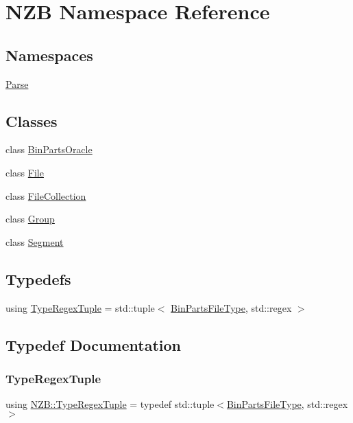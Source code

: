 \hypertarget{namespace_n_z_b}{}\section{N\+ZB Namespace Reference}
\label{namespace_n_z_b}
\subsection*{Namespaces}
\begin{DoxyCompactItemize}
\item 
 \hyperlink{namespace_n_z_b_1_1_parse}{Parse}
\end{DoxyCompactItemize}
\subsection*{Classes}
\begin{DoxyCompactItemize}
\item 
class \hyperlink{class_n_z_b_1_1_bin_parts_oracle}{Bin\+Parts\+Oracle}
\item 
class \hyperlink{class_n_z_b_1_1_file}{File}
\item 
class \hyperlink{class_n_z_b_1_1_file_collection}{File\+Collection}
\item 
class \hyperlink{class_n_z_b_1_1_group}{Group}
\item 
class \hyperlink{class_n_z_b_1_1_segment}{Segment}
\end{DoxyCompactItemize}
\subsection*{Typedefs}
\begin{DoxyCompactItemize}
\item 
using \hyperlink{namespace_n_z_b_a4269a0ca0fc28aeec7108729ce5f4f2d}{Type\+Regex\+Tuple} = std\+::tuple$<$ \hyperlink{bin_parts_8h_aa1299690332d809ca3f8cb77e7019e41}{Bin\+Parts\+File\+Type}, std\+::regex $>$
\end{DoxyCompactItemize}


\subsection{Typedef Documentation}
\hypertarget{namespace_n_z_b_a4269a0ca0fc28aeec7108729ce5f4f2d}{}\label{namespace_n_z_b_a4269a0ca0fc28aeec7108729ce5f4f2d} 
\subsubsection{\texorpdfstring{Type\+Regex\+Tuple}{TypeRegexTuple}}
{\footnotesize\ttfamily using \hyperlink{namespace_n_z_b_a4269a0ca0fc28aeec7108729ce5f4f2d}{N\+Z\+B\+::\+Type\+Regex\+Tuple} = typedef std\+::tuple$<$\hyperlink{bin_parts_8h_aa1299690332d809ca3f8cb77e7019e41}{Bin\+Parts\+File\+Type}, std\+::regex$>$}


